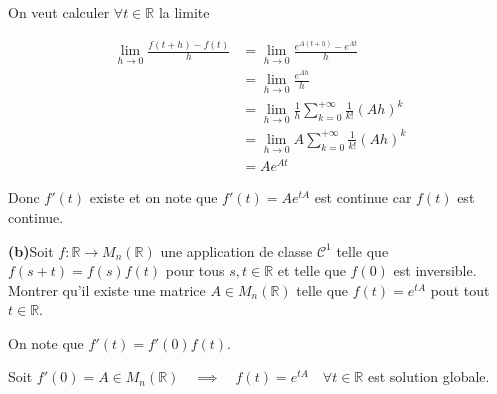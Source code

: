 \documentclass[french]{article}
\begin{document}
	On veut calculer $\forall t \in \mathbb{R}$ la limite 
	
	\begin{align}
		\lim_{h \to 0} \frac{f(t+h) - f(t)}{h} &= \lim_{h \to 0} \frac{e^{A(t+h)} - e^{At}}{h} \\
		&= \lim_{h \to 0} \frac{e^{Ah}}{h}\\
		&= \lim_{h \to 0} \frac{1}{h} \sum_{k = 0}^{+\infty} \frac{1}{k!} (Ah)^k\\
		&= \lim_{h \to 0} A \sum_{k = 0}^{+\infty} \frac{1}{k!} (Ah)^k \\
		&= A e^{At}
	\end{align}
	
	Donc $f'(t)$ existe et on note que $f'(t) = Ae^{tA}$ est continue car $f(t)$ est continue.
	

	\begin{tcolorbox}[colback=gray!5!white,colframe=gray!75!black]
		\textbf{\large{(b)}}Soit $f:\mathbb{R} \to M_n(\mathbb{R})$ une application de classe $\mathcal{C}^1$ telle que $f(s+t) = f(s)f(t)$ pour tous $s,t \in \mathbb{R}$ et telle que $f(0)$ est inversible. Montrer qu'il existe une matrice $A \in M_n(\mathbb{R})$ telle que $f(t) = e^{tA}$ pout tout $t \in \mathbb{R}$.
	\end{tcolorbox}

	On note que $f'(t) = f'(0)f(t)$.
	
	Soit $f'(0) = A \in M_n(\mathbb{R}) \quad \implies \quad  f(t) = e^{tA} \quad \forall t \in \mathbb{R}$ est solution globale.
	
\end{document}
